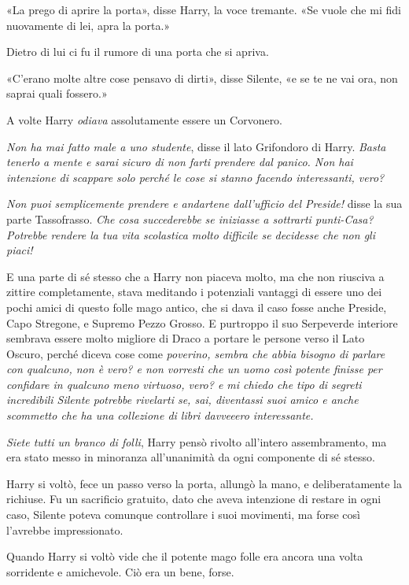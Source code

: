 «La prego di aprire la porta», disse Harry, la voce tremante. «Se vuole che mi fidi nuovamente di lei, apra la porta.»

Dietro di lui ci fu il rumore di una porta che si apriva.

«C’erano molte altre cose pensavo di dirti», disse Silente, «e se te ne vai ora, non saprai quali fossero.»

A volte Harry \textit{odiava} assolutamente essere un Corvonero.

\textit{Non ha mai fatto male a uno studente}, disse il lato Grifondoro di Harry. \textit{Basta tenerlo a mente e sarai sicuro di non farti prendere dal panico. Non hai intenzione di scappare solo perché le cose si stanno facendo interessanti, vero?}

\textit{Non puoi semplicemente prendere e andartene dall’ufficio del Preside!} disse la sua parte Tassofrasso. \textit{Che cosa succederebbe se iniziasse a sottrarti punti-Casa? Potrebbe rendere la tua vita scolastica molto difficile se decidesse che non gli piaci!}

E una parte di sé stesso che a Harry non piaceva molto, ma che non riusciva a zittire completamente, stava meditando i potenziali vantaggi di essere uno dei pochi amici di questo folle mago antico, che si dava il caso fosse anche Preside, Capo Stregone, e Supremo Pezzo Grosso. E purtroppo il suo Serpeverde interiore sembrava essere molto migliore di Draco a portare le persone verso il Lato Oscuro, perché diceva cose come \textit{poverino, sembra che abbia bisogno di parlare con qualcuno, non è vero? e non vorresti che un uomo così potente finisse per confidare in qualcuno meno virtuoso, vero? e mi chiedo che tipo di segreti incredibili Silente potrebbe rivelarti se, sai, diventassi suoi amico e anche scommetto che ha una collezione di libri davveeero interessante.}

\textit{Siete tutti un branco di folli}, Harry pensò rivolto all’intero assembramento, ma era stato messo in minoranza all’unanimità da ogni componente di sé stesso.

Harry si voltò, fece un passo verso la porta, allungò la mano, e deliberatamente la richiuse. Fu un sacrificio gratuito, dato che aveva intenzione di restare in ogni caso, Silente poteva comunque controllare i suoi movimenti, ma forse così l’avrebbe impressionato.

Quando Harry si voltò vide che il potente mago folle era ancora una volta sorridente e amichevole. Ciò era un bene, forse.

